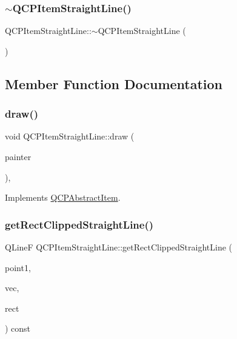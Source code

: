 \subsubsection{\texorpdfstring{$\sim$\+Q\+C\+P\+Item\+Straight\+Line()}{~QCPItemStraightLine()}}
{\footnotesize\ttfamily Q\+C\+P\+Item\+Straight\+Line\+::$\sim$\+Q\+C\+P\+Item\+Straight\+Line (\begin{DoxyParamCaption}{ }\end{DoxyParamCaption})\hspace{0.3cm}{\ttfamily [virtual]}}



\subsection{Member Function Documentation}
\mbox{\label{class_q_c_p_item_straight_line_acbc84ad219bf4845152e4e2202fcaa3c}} 
\subsubsection{\texorpdfstring{draw()}{draw()}}
{\footnotesize\ttfamily void Q\+C\+P\+Item\+Straight\+Line\+::draw (\begin{DoxyParamCaption}\item[{\hyperlink{class_q_c_p_painter}{Q\+C\+P\+Painter} $\ast$}]{painter }\end{DoxyParamCaption})\hspace{0.3cm}{\ttfamily [protected]}, {\ttfamily [virtual]}}



Implements \hyperlink{class_q_c_p_abstract_item_a007fdab79c935a5da5aa04a21d268c18}{Q\+C\+P\+Abstract\+Item}.

\mbox{\label{class_q_c_p_item_straight_line_ae1de3d4121c06e5ffea4961722a54f5e}} 
\subsubsection{\texorpdfstring{get\+Rect\+Clipped\+Straight\+Line()}{getRectClippedStraightLine()}}
{\footnotesize\ttfamily Q\+LineF Q\+C\+P\+Item\+Straight\+Line\+::get\+Rect\+Clipped\+Straight\+Line (\begin{DoxyParamCaption}\item[{const \hyperlink{class_q_c_p_vector2_d}{Q\+C\+P\+Vector2D} \&}]{point1,  }\item[{const \hyperlink{class_q_c_p_vector2_d}{Q\+C\+P\+Vector2D} \&}]{vec,  }\item[{const Q\+Rect \&}]{rect }\end{DoxyParamCaption}) const\hspace{0.3cm}{\ttfamily [protected]}}

